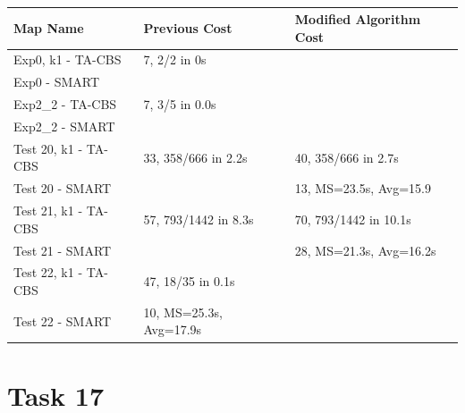 \documentclass[11pt]{article}
\begin{document}
\begin{table}
    \centering
    \begin{tabular}{lll}
        \toprule
        \textbf{Map Name} & \textbf{Previous Cost } & \textbf{Modified Algorithm Cost}\\
        \midrule
        Exp0, k1 - TA-CBS & 7, 2/2 in 0s &  \\
        Exp0 - SMART &  &  \\
        Exp2\_2 - TA-CBS & 7, 3/5 in 0.0s &  \\
        Exp2\_2 - SMART &  &  \\
        Test 20, k1 - TA-CBS & 33, 358/666 in 2.2s & 40, 358/666 in 2.7s\\
        Test 20 - SMART & & 13, MS=23.5s, Avg=15.9  \\
        Test 21, k1 - TA-CBS & 57, 793/1442 in 8.3s & 70, 793/1442 in 10.1s \\
        Test 21 - SMART & & 28, MS=21.3s, Avg=16.2s  \\
        Test 22, k1 - TA-CBS & 47, 18/35 in 0.1s &  \\
        Test 22 - SMART & 10, MS=25.3s, Avg=17.9s &  \\
        \bottomrule
    \end{tabular}
    \caption{}
    \label{tab:}
\end{table}

\section*{Task 17}
\end{document}
